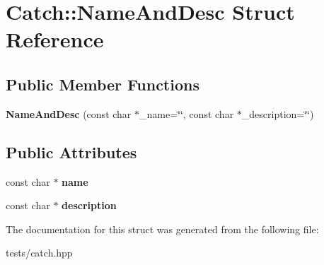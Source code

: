 \hypertarget{struct_catch_1_1_name_and_desc}{}\section{Catch\+:\+:Name\+And\+Desc Struct Reference}
\label{struct_catch_1_1_name_and_desc}
\subsection*{Public Member Functions}
\begin{DoxyCompactItemize}
\item 
\mbox{\label{struct_catch_1_1_name_and_desc_a189ceb9942fb5f6635140d6a09fc843a}} 
{\bfseries Name\+And\+Desc} (const char $\ast$\+\_\+name=\char`\"{}\char`\"{}, const char $\ast$\+\_\+description=\char`\"{}\char`\"{})
\end{DoxyCompactItemize}
\subsection*{Public Attributes}
\begin{DoxyCompactItemize}
\item 
\mbox{\label{struct_catch_1_1_name_and_desc_a374b4ed8be3cf98be20ebde5273bde51}} 
const char $\ast$ {\bfseries name}
\item 
\mbox{\label{struct_catch_1_1_name_and_desc_a3463a23ff65ce494fc380452b57b7970}} 
const char $\ast$ {\bfseries description}
\end{DoxyCompactItemize}


The documentation for this struct was generated from the following file\+:\begin{DoxyCompactItemize}
\item 
tests/catch.\+hpp\end{DoxyCompactItemize}
